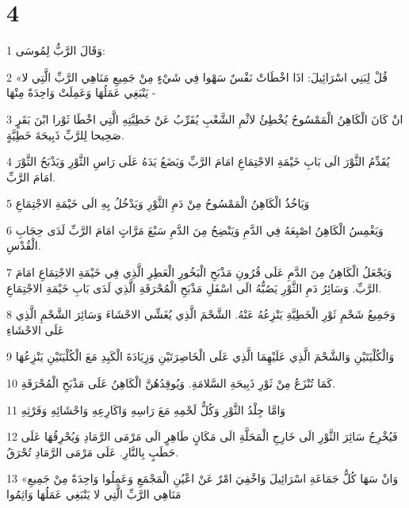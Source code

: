 \chapter{4}

\par 1 وَقَالَ الرَّبُّ لِمُوسَى:
\par 2 «قُلْ لِبَنِي اسْرَائِيلَ: اذَا اخْطَاتْ نَفْسٌ سَهْوا فِي شَيْءٍ مِنْ جَمِيعِ مَنَاهِي الرَّبِّ الَّتِي لا يَنْبَغِي عَمَلُهَا وَعَمِلَتْ وَاحِدَةً مِنْهَا -
\par 3 انْ كَانَ الْكَاهِنُ الْمَمْسُوحُ يُخْطِئُ لاثْمِ الشَّعْبِ يُقَرِّبُ عَنْ خَطِيَّتِهِ الَّتِي اخْطَا ثَوْرا ابْنَ بَقَرٍ صَحِيحا لِلرَّبِّ ذَبِيحَةَ خَطِيَّةٍ.
\par 4 يُقَدِّمُ الثَّوْرَ الَى بَابِ خَيْمَةِ الاجْتِمَاعِ امَامَ الرَّبِّ وَيَضَعُ يَدَهُ عَلَى رَاسِ الثَّوْرِ وَيَذْبَحُ الثَّوْرَ امَامَ الرَّبِّ.
\par 5 وَيَاخُذُ الْكَاهِنُ الْمَمْسُوحُ مِنْ دَمِ الثَّوْرِ وَيَدْخُلُ بِهِ الَى خَيْمَةِ الاجْتِمَاعِ
\par 6 وَيَغْمِسُ الْكَاهِنُ اصْبِعَهُ فِي الدَّمِ وَيَنْضِحُ مِنَ الدَّمِ سَبْعَ مَرَّاتٍ امَامَ الرَّبِّ لَدَى حِجَابِ الْقُدْسِ.
\par 7 وَيَجْعَلُ الْكَاهِنُ مِنَ الدَّمِ عَلَى قُرُونِ مَذْبَحِ الْبَخُورِ الْعَطِرِ الَّذِي فِي خَيْمَةِ الاجْتِمَاعِ امَامَ الرَّبِّ. وَسَائِرُ دَمِ الثَّوْرِ يَصُبُّهُ الَى اسْفَلِ مَذْبَحِ الْمُحْرَقَةِ الَّذِي لَدَى بَابِ خَيْمَةِ الاجْتِمَاعِ.
\par 8 وَجَمِيعُ شَحْمِ ثَوْرِ الْخَطِيَّةِ يَنْزِعُهُ عَنْهُ. الشَّحْمَ الَّذِي يُغَشِّي الاحْشَاءَ وَسَائِرَ الشَّحْمِ الَّذِي عَلَى الاحْشَاءِ
\par 9 وَالْكُلْيَتَيْنِ وَالشَّحْمَ الَّذِي عَلَيْهِمَا الَّذِي عَلَى الْخَاصِرَتَيْنِ وَزِيَادَةَ الْكَبِدِ مَعَ الْكُلْيَتَيْنِ يَنْزِعُهَا
\par 10 كَمَا تُنْزَعُ مِنْ ثَوْرِ ذَبِيحَةِ السَّلامَةِ. وَيُوقِدُهُنَّ الْكَاهِنُ عَلَى مَذْبَحِ الْمُحْرَقَةِ.
\par 11 وَامَّا جِلْدُ الثَّوْرِ وَكُلُّ لَحْمِهِ مَعَ رَاسِهِ وَاكَارِعِهِ وَاحْشَائِهِ وَفَرْثِهِ
\par 12 فَيُخْرِجُ سَائِرَ الثَّوْرِ الَى خَارِجِ الْمَحَلَّةِ الَى مَكَانٍ طَاهِرٍ الَى مَرْمَى الرَّمَادِ وَيُحْرِقُهَا عَلَى حَطَبٍ بِالنَّارِ. عَلَى مَرْمَى الرَّمَادِ تُحْرَقُ.
\par 13 «وَانْ سَهَا كُلُّ جَمَاعَةِ اسْرَائِيلَ وَاخْفِيَ امْرٌ عَنْ اعْيُنِ الْمَجْمَعِ وَعَمِلُوا وَاحِدَةً مِنْ جَمِيعِ مَنَاهِي الرَّبِّ الَّتِي لا يَنْبَغِي عَمَلُهَا وَاثِمُوا
